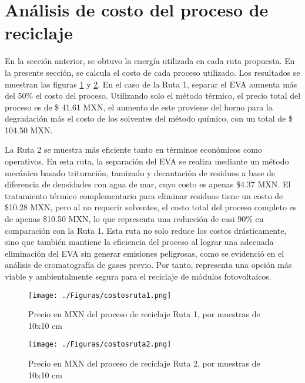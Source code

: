 \section{Análisis de costo del proceso de reciclaje}    
\label{subsec:costodelproceso}

En la sección anterior, se obtuvo la energía utilizada en cada ruta propuesta. En la presente sección, se calcula el costo de cada proceso utilizado. Los resultados se muestran las figuras \ref{fig:costosruta1} y \ref{fig:costosruta2}. En el caso de la Ruta 1, separar el EVA aumenta más del 50\% el costo del proceso. Utilizando solo el método térmico, el precio total del proceso es de  \$ 41.61 MXN, el aumento de este proviene del horno para la degradación más el costo de los solventes del método químico, con un total de \$ 104.50 MXN. 

La Ruta 2 se muestra más eficiente tanto en términos económicos como operativos. En esta ruta, la separación del EVA se realiza mediante un método mecánico basado trituración, tamizado y decantación de residuos a base de diferencia de densidades con agua de mar, cuyo costo es apenas \$4.37 MXN. El tratamiento térmico complementario para eliminar residuos tiene un costo de \$10.28 MXN, pero al no requerir solventes, el costo total del proceso completo es de apenas \$10.50 MXN, lo que representa una reducción de casi 90\% en comparación con la Ruta 1. Esta ruta no solo reduce los costos drásticamente, sino que también mantiene la eficiencia del proceso al lograr una adecuada eliminación del EVA sin generar emisiones peligrosas, como se evidenció en el análisis de cromatografía de gases previo. Por tanto,  representa una opción más viable y ambientalmente segura para el reciclaje de módulos fotovoltaicos.


\begin{figure}[htb]
	\begin{center}
		\texttt{[image: ./Figuras/costosruta1.png]}
	\end{center}
	\vspace{-1em} %
	\caption{Precio en MXN del proceso de reciclaje Ruta 1, por muestras de 10x10 cm}
	\label{fig:costosruta1}
\end{figure}



\begin{figure}[htb]
	\begin{center}
		\texttt{[image: ./Figuras/costosruta2.png]}
	\end{center}
	\vspace{-1em} %
	\caption{Precio en MXN del proceso de reciclaje Ruta 2, por muestras de 10x10 cm}
	\label{fig:costosruta2}
\end{figure}


